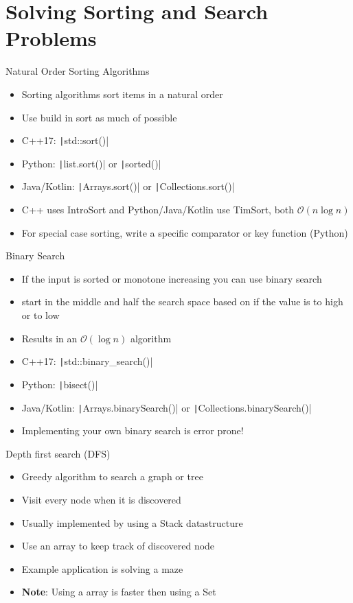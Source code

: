 \documentclass[11pt,pdf, aspectratio=169]{beamer}
\begin{document}
  \section{Solving Sorting and Search Problems}
  \begin{frame}{Natural Order Sorting Algorithms}
    \begin{itemize}
      \item Sorting algorithms sort items in a natural order
      \item Use build in sort as much of possible
      \item C++17: \texttt|std::sort()|
      \item Python: \texttt|list.sort()| or \texttt|sorted()|
      \item Java/Kotlin: \texttt|Arrays.sort()| or \texttt|Collections.sort()|
      \item C++ uses IntroSort and Python/Java/Kotlin use TimSort, both $\mathcal{O}(n\log{}n)$
      \item For special case sorting, write a specific comparator or key function (Python)
    \end{itemize}
  \end{frame}
  \begin{frame}{Binary Search}
    \begin{itemize}
      \item If the input is sorted or monotone increasing you can use binary search
      \item start in the middle and half the search space based on if the value is to high or to low
      \item Results in an $\mathcal{O}(\log{}n)$ algorithm
      \item C++17: \texttt|std::binary_search()|
      \item Python: \texttt|bisect()|
      \item Java/Kotlin: \texttt|Arrays.binarySearch()| or \texttt|Collections.binarySearch()|
      \item Implementing your own binary search is error prone!
    \end{itemize}
  \end{frame}
  \begin{frame}{Depth first search (DFS)}
    \begin{itemize}
      \item Greedy algorithm to search a graph or tree
      \item Visit every node when it is discovered
      \item Usually implemented by using a Stack datastructure
      \item Use an array to keep track of discovered node
      \item Example application is solving a maze
      \item \textbf{Note}: Using a array is faster then using a Set
    \end{itemize}
  \end{frame}
\end{document}
